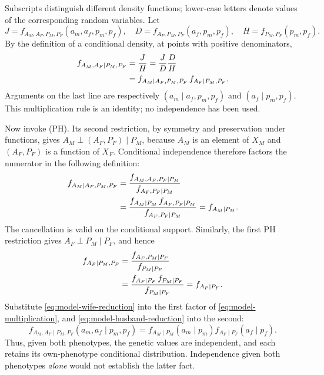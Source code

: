 Subscripts distinguish different density functions; lower-case letters
denote values of the corresponding random variables. Let
\[
 J=f_{A_M,A_F,P_M,P_F}(a_m,a_f,p_m,p_f),\quad
 D=f_{A_F,P_M,P_F}(a_f,p_m,p_f),\quad
 H=f_{P_M,P_F}(p_m,p_f).
\]
By the definition of a conditional density, at points with positive
denominators,
\begin{align}
 f_{A_M,A_F\mid P_M,P_F}
 &=\frac{J}{H}
   =\frac{J}{D}\frac{D}{H}\notag\\
 &=f_{A_M\mid A_F,P_M,P_F}\,
   f_{A_F\mid P_M,P_F}.
 \label{eq:model-multiplication}
\end{align}
Arguments on the last line are respectively
$(a_m\mid a_f,p_m,p_f)$ and $(a_f\mid p_m,p_f)$.
This multiplication rule is an identity; no independence has been used.

Now invoke (PH). Its second restriction, by symmetry and preservation
under functions, gives $A_M\perp(A_F,P_F)\mid P_M$, because
$A_M$ is an element of $X_M$ and $(A_F,P_F)$ is a function of $X_F$.
Conditional independence therefore factors the numerator in the
following definition:
\begin{align}
 f_{A_M\mid A_F,P_M,P_F}
 &=\frac{f_{A_M,A_F,P_F\mid P_M}}{f_{A_F,P_F\mid P_M}}\notag\\
 &=\frac{f_{A_M\mid P_M}\,f_{A_F,P_F\mid P_M}}
         {f_{A_F,P_F\mid P_M}}
 =f_{A_M\mid P_M}.
 \label{eq:model-wife-reduction}
\end{align}
The cancellation is valid on the conditional support. Similarly, the
first PH restriction gives $A_F\perp P_M\mid P_F$, and hence
\begin{align}
 f_{A_F\mid P_M,P_F}
 &=\frac{f_{A_F,P_M\mid P_F}}{f_{P_M\mid P_F}}\notag\\
 &=\frac{f_{A_F\mid P_F}\,f_{P_M\mid P_F}}{f_{P_M\mid P_F}}
 =f_{A_F\mid P_F}.
 \label{eq:model-husband-reduction}
\end{align}
Substitute \eqref{eq:model-wife-reduction} into the first factor of
\eqref{eq:model-multiplication}, and
\eqref{eq:model-husband-reduction} into the second:
\begin{equation}
 f_{A_M,A_F\mid P_M,P_F}(a_m,a_f\mid p_m,p_f)
 =f_{A_M\mid P_M}(a_m\mid p_m)
  f_{A_F\mid P_F}(a_f\mid p_f).
 \label{eq:model-density-factor}
\end{equation}
Thus, given both phenotypes, the genetic values are independent, and
each retains its own-phenotype conditional distribution. Independence
given both phenotypes \emph{alone} would not establish the latter fact.

